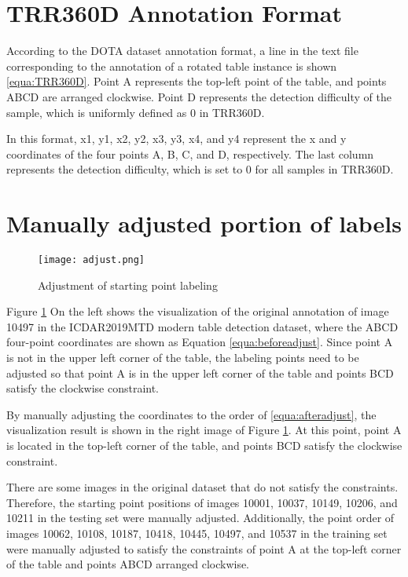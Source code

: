 \documentclass{article}
\begin{document}
\section{TRR360D Annotation Format}



According to the DOTA\cite{Xia2018} dataset annotation format, a line in the text file corresponding to the annotation of a rotated table instance is shown \ref{equa:TRR360D}. Point A represents the top-left point of the table, and points ABCD are arranged clockwise. Point D represents the detection difficulty of the sample, which is uniformly defined as 0 in TRR360D.



In this format, x1, y1, x2, y2, x3, y3, x4, and y4 represent the x and y coordinates of the four points A, B, C, and D, respectively. The last column represents the detection difficulty, which is set to 0 for all samples in TRR360D.


\section{Manually adjusted portion of labels}



\begin{figure}[ht]
    \centering
    \texttt{[image: adjust.png]}
    \caption{Adjustment of starting point labeling}
    \label{fig:AdjustPoint}
\end{figure}

Figure \ref{fig:AdjustPoint} On the left shows the visualization of the original annotation of image 10497 in the ICDAR2019MTD modern table detection dataset, where the ABCD four-point coordinates are shown as Equation \ref{equa:beforeadjust}. Since point A is not in the upper left corner of the table, the labeling points need to be adjusted so that point A is in the upper left corner of the table and points BCD satisfy the clockwise constraint.



By manually adjusting the coordinates to the order of \ref{equa:afteradjust}, the visualization result is shown in the right image of Figure \ref{fig:AdjustPoint}. At this point, point A is located in the top-left corner of the table, and points BCD satisfy the clockwise constraint.




There are some images in the original dataset that do not satisfy the constraints. Therefore, the starting point positions of images 10001, 10037, 10149, 10206, and 10211 in the testing set were manually adjusted. Additionally, the point order of images 10062, 10108, 10187, 10418, 10445, 10497, and 10537 in the training set were manually adjusted to satisfy the constraints of point A at the top-left corner of the table and points ABCD arranged clockwise.
\end{document}
